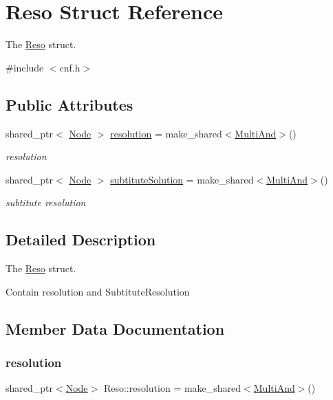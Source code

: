 \hypertarget{struct_reso}{}\section{Reso Struct Reference}
\label{struct_reso}


The \hyperlink{struct_reso}{Reso} struct.  




{\ttfamily \#include $<$cnf.\+h$>$}

\subsection*{Public Attributes}
\begin{DoxyCompactItemize}
\item 
shared\+\_\+ptr$<$ \hyperlink{class_node}{Node} $>$ \hyperlink{struct_reso_abed916813c2db4251c02a16d0c893f32}{resolution} = make\+\_\+shared$<$\hyperlink{class_multi_and}{Multi\+And}$>$()
\begin{DoxyCompactList}\small\item\em resolution \end{DoxyCompactList}\item 
shared\+\_\+ptr$<$ \hyperlink{class_node}{Node} $>$ \hyperlink{struct_reso_a05bb25e26bbb88ef723dae77656fb0d4}{subtitute\+Solution} = make\+\_\+shared$<$\hyperlink{class_multi_and}{Multi\+And}$>$()
\begin{DoxyCompactList}\small\item\em subtitute resolution \end{DoxyCompactList}\end{DoxyCompactItemize}


\subsection{Detailed Description}
The \hyperlink{struct_reso}{Reso} struct. 

Contain resolution and Subtitute\+Resolution 

\subsection{Member Data Documentation}
\mbox{\label{struct_reso_abed916813c2db4251c02a16d0c893f32}} 
\subsubsection{\texorpdfstring{resolution}{resolution}}
{\footnotesize\ttfamily shared\+\_\+ptr$<$\hyperlink{class_node}{Node}$>$ Reso\+::resolution = make\+\_\+shared$<$\hyperlink{class_multi_and}{Multi\+And}$>$()}



